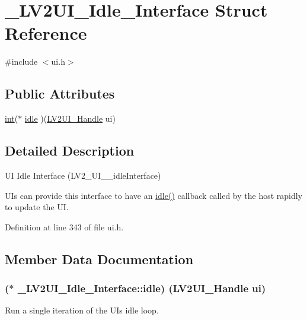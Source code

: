 \hypertarget{struct___l_v2_u_i___idle___interface}{}\section{\+\_\+\+L\+V2\+U\+I\+\_\+\+Idle\+\_\+\+Interface Struct Reference}
\label{struct___l_v2_u_i___idle___interface}


{\ttfamily \#include $<$ui.\+h$>$}

\subsection*{Public Attributes}
\begin{DoxyCompactItemize}
\item 
\hyperlink{xmltok_8h_a5a0d4a5641ce434f1d23533f2b2e6653}{int}($\ast$ \hyperlink{struct___l_v2_u_i___idle___interface_ae8365fae89d5951f6727f59eebc15dac}{idle} )(\hyperlink{ui_8h_aea72a15db080a61e5e222fed84047e90}{L\+V2\+U\+I\+\_\+\+Handle} ui)
\end{DoxyCompactItemize}


\subsection{Detailed Description}
UI Idle Interface (L\+V2\+\_\+\+U\+I\+\_\+\+\_\+idle\+Interface)

U\+Is can provide this interface to have an \hyperlink{struct___l_v2_u_i___idle___interface_ae8365fae89d5951f6727f59eebc15dac}{idle()} callback called by the host rapidly to update the UI. 

Definition at line 343 of file ui.\+h.



\subsection{Member Data Documentation}
\subsubsection[{\texorpdfstring{idle}{idle}}]{($\ast$ \+\_\+\+L\+V2\+U\+I\+\_\+\+Idle\+\_\+\+Interface\+::idle) ({\bf L\+V2\+U\+I\+\_\+\+Handle} ui)}\hypertarget{struct___l_v2_u_i___idle___interface_ae8365fae89d5951f6727f59eebc15dac}{}\label{struct___l_v2_u_i___idle___interface_ae8365fae89d5951f6727f59eebc15dac}
Run a single iteration of the UI\textquotesingle{}s idle loop.

